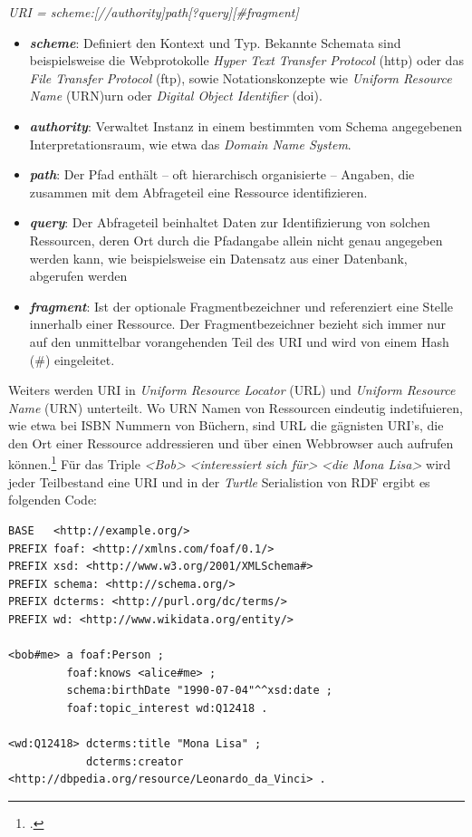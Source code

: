 \documentclass[12pt,a4paper]{article}
\begin{document}
\begin{center}
\textit{URI = scheme:[//authority]path[?query][\#fragment]}
\\
\end{center}
\begin{itemize}
\item \textbf{\textit{scheme}}: Definiert den Kontext und Typ. Bekannte Schemata sind beispielsweise die Webprotokolle \textit{Hyper Text Transfer Protocol} (http) oder das \textit{File Transfer Protocol} (ftp), sowie Notationskonzepte wie \textit{Uniform Resource Name} (URN)urn oder \textit{Digital Object Identifier} (doi).
\item \textbf{\textit{authority}}: Verwaltet Instanz in einem bestimmten vom Schema angegebenen Interpretationsraum, wie etwa das \textit{Domain Name System}.
\item \textbf{\textit{path}}: Der Pfad enthält – oft hierarchisch organisierte – Angaben, die zusammen mit dem Abfrageteil eine Ressource identifizieren. 
\item \textbf{\textit{query}}: Der Abfrageteil beinhaltet Daten zur Identifizierung von solchen Ressourcen, deren Ort durch die Pfadangabe allein nicht genau angegeben werden kann, wie beispielsweise ein Datensatz aus einer Datenbank, abgerufen werden
\item \textbf{\textit{fragment}}: Ist der optionale Fragmentbezeichner und referenziert eine Stelle innerhalb einer Ressource. Der Fragmentbezeichner bezieht sich immer nur auf den unmittelbar vorangehenden Teil des URI und wird von einem Hash (\#) eingeleitet.
\end{itemize}

Weiters werden URI in \textit{Uniform Resource Locator} (URL) und \textit{Uniform Resource Name} (URN) unterteilt. Wo URN Namen von Ressourcen eindeutig indetifuieren, wie etwa bei ISBN Nummern von Büchern, sind URL die gägnisten URI's, die den Ort einer Ressource addressieren und über einen Webbrowser auch aufrufen können.\footcite[Vgl.][S.21-22]{powers2003practical} Für das Triple \textit{<Bob>} \textit{<interessiert sich für>} \textit{<die Mona Lisa>} wird jeder Teilbestand eine URI und in der \textit{Turtle} Serialistion von RDF ergibt es folgenden Code:
\begin{lstlisting}[]
BASE   <http://example.org/>
PREFIX foaf: <http://xmlns.com/foaf/0.1/>
PREFIX xsd: <http://www.w3.org/2001/XMLSchema#>
PREFIX schema: <http://schema.org/>
PREFIX dcterms: <http://purl.org/dc/terms/>
PREFIX wd: <http://www.wikidata.org/entity/>

<bob#me> a foaf:Person ;
         foaf:knows <alice#me> ;
         schema:birthDate "1990-07-04"^^xsd:date ;
         foaf:topic_interest wd:Q12418 .
 
<wd:Q12418> dcterms:title "Mona Lisa" ;
            dcterms:creator <http://dbpedia.org/resource/Leonardo_da_Vinci> .
\end{lstlisting}
\end{document}
